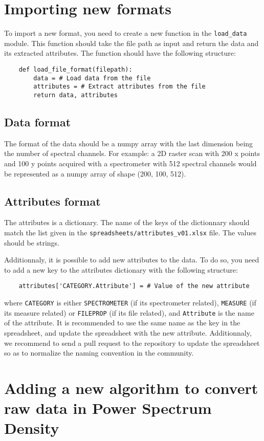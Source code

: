 \documentclass[a4paper,12pt]{article}
\begin{document}
\section{Importing new formats}
To import a new format, you need to create a new function in the \texttt{load\_data} module. This function should take the file path as input and return the data and its extracted attributes. The function should have the following structure:
\begin{verbatim}
    def load_file_format(filepath):
        data = # Load data from the file
        attributes = # Extract attributes from the file
        return data, attributes
\end{verbatim}

\subsection{Data format}
The format of the data should be a numpy array with the last dimension being the number of spectral channels. For example: a 2D raster scan with 200 x points and 100 y points acquired with a spectrometer with 512 spectral channels would be represented as a numpy array of shape (200, 100, 512).

\subsection{Attributes format}
The attributes is a dictionary. The name of the keys of the dictionnary should match the list given in the \texttt{spreadsheets/attributes\_v01.xlsx} file. The values should be strings.

Additionnaly, it is possible to add new attributes to the data. To do so, you need to add a new key to the attributes dictionary with the following structure:
\begin{verbatim}
    attributes['CATEGORY.Attribute'] = # Value of the new attribute
\end{verbatim}
where \texttt{CATEGORY} is either \texttt{SPECTROMETER} (if its spectrometer related), \texttt{MEASURE} (if its measure related) or \texttt{FILEPROP} (if its file related), and \texttt{Attribute} is the name of the attribute. It is recommended to use the same name as the key in the spreadsheet, and update the spreadsheet with the new attribute. Additionnaly, we recommend to send a pull request to the repository to update the spreadsheet so as to normalize the naming convention in the community.

\section{Adding a new algorithm to convert raw data in Power Spectrum Density}
\end{document}

